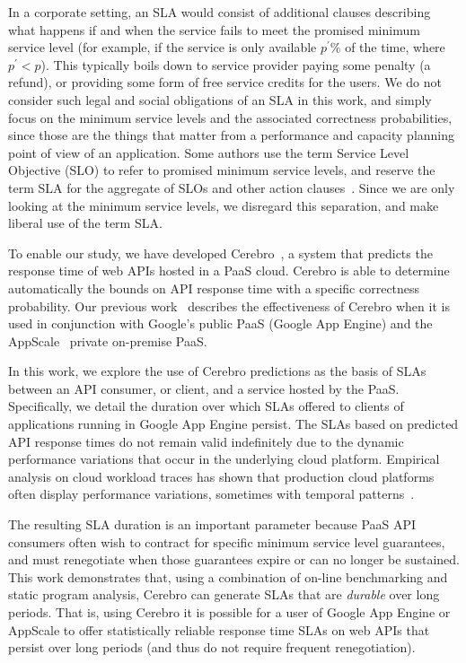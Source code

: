 In a corporate setting, an 
SLA would consist of additional clauses describing what happens if and when the
service fails to meet the promised minimum service level (for example, if the
service is only available $p^\prime\%$ of the time, where $p^\prime < p$). This
typically boils down to service provider paying some penalty (a refund), or 
providing some form of free service credits for the users. We do not consider such
legal and social obligations of an SLA in this work, and simply focus on the
minimum service levels and the associated correctness probabilities, since those
are the things that matter from a performance and capacity planning point of view
of an application. Some authors use the term Service Level Objective (SLO) to
refer to promised minimum service levels, and reserve the term SLA for the
aggregate of SLOs and other action clauses~\cite{Keller:2003:WFS:635430.635442}.
Since we are only looking at the minimum service levels, we disregard this
separation, and make liberal use of the term SLA.


To enable our study, we have developed Cerebro~\cite{Jayathilaka:2015:RTS:2806777.2806842},
a system that
predicts the response time of web APIs hosted in a PaaS cloud. Cerebro is able to
determine automatically the bounds on API response time with a specific
correctness probability.
Our previous work~\cite{Jayathilaka:2015:RTS:2806777.2806842} describes the effectiveness of
Cerebro when it is used in conjunction with Google's public PaaS (Google
App Engine) and the AppScale~\cite{6488671} private on-premise PaaS.  

In this work, we
explore the use of Cerebro predictions as the basis of SLAs between an API
consumer, or client,
and a service hosted by the PaaS.  Specifically, we detail the duration
over which SLAs offered to clients of applications running in Google App
Engine persist. The SLAs based on predicted API response times do not remain 
valid indefinitely due to the
dynamic performance variations that occur in the underlying cloud platform.
Empirical analysis on cloud workload traces has shown that production cloud
platforms often display performance variations, sometimes with temporal
patterns~\cite{5948601}.

The resulting SLA duration is an important parameter because PaaS API consumers
often
wish to contract for specific minimum service level guarantees, and must
renegotiate when those guarantees expire or can no longer be sustained.  
This work demonstrates that, using a combination of on-line benchmarking
and static program analysis, Cerebro can generate SLAs that are
\textit{durable} over long periods.  That is, using Cerebro it is possible for
a user of Google App Engine or AppScale to offer statistically
reliable response time SLAs on web APIs
that persist over long periods (and thus do not require frequent
renegotiation).

